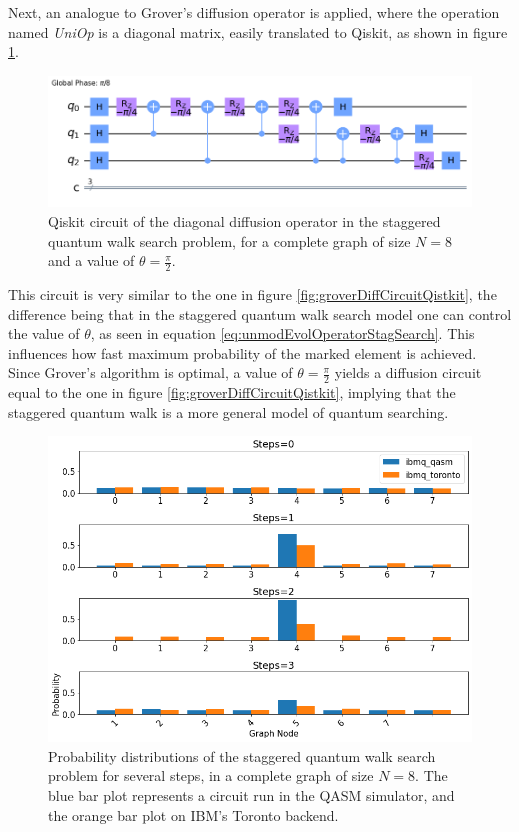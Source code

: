 \documentclass[../../dissertation.tex]{subfiles}
\begin{document}
Next, an analogue to Grover's diffusion operator is applied, where the
operation named \textit{UniOp} is a diagonal matrix, easily translated to
Qiskit, as shown in figure \ref{fig:stagSearchUniOpCircQistkit}.  
\begin{figure}[!h]
	\centering
	\includegraphics[scale=0.40]{img/Qiskit/StaggeredQW/Search/Circuits/StagUniOpCircuit_N3_M0_S3.png}
	\caption{Qiskit circuit of the  diagonal diffusion operator in the staggered quantum walk search problem, for a complete graph of size $N=8$ and a value of $\theta = \frac{\pi}{2}$.}
	\label{fig:stagSearchUniOpCircQistkit}
\end{figure}
This circuit is very similar to the one in figure
\ref{fig:groverDiffCircuitQistkit}, the difference being that in the staggered
quantum walk search model one can control the value of $\theta$, as seen
in equation \eqref{eq:unmodEvolOperatorStagSearch}. This influences how fast
maximum probability of the marked element is achieved. Since Grover's algorithm
is optimal, a value of $\theta=\frac{\pi}{2}$ yields a diffusion circuit equal
to the one in figure \ref{fig:groverDiffCircuitQistkit}, implying that the
staggered quantum walk is a more general model of quantum searching.
\begin{figure}[!h]
	\centering
	\includegraphics[scale=0.40]{img/Qiskit/StaggeredQW/Search/stagSearchToronto_N3_S0123.png}
	\caption{Probability distributions of the staggered quantum walk search problem for several steps, in a complete graph of size $N=8$. The blue bar plot represents a circuit run in the QASM simulator, and the orange bar plot on IBM's Toronto backend.}
	\label{fig:stagSearchResultsToronto}
\end{figure}\par
\end{document}
